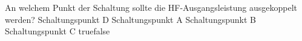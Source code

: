     {An welchem Punkt der Schaltung sollte die HF-Ausgangsleistung ausgekoppelt werden?}
    {Schaltungspunkt D}
    {Schaltungspunkt A}
    {Schaltungspunkt B}
    {Schaltungspunkt C}
    {true}{false}
